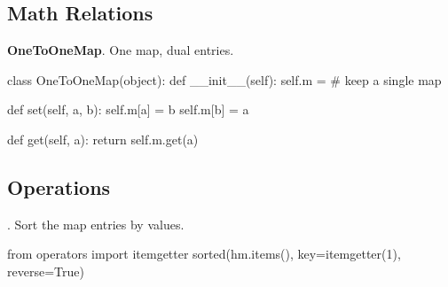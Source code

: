 \subsection{Math Relations}
\textbf{OneToOneMap}. One map, dual entries.
\begin{python}
class OneToOneMap(object):
    def __init__(self):
        self.m = {}  # keep a single map

    def set(self, a, b):
        self.m[a] = b
        self.m[b] = a

    def get(self, a):
        return self.m.get(a)
\end{python}
\subsection{Operations}
. Sort the map entries by values. 
\begin{python}
from operators import itemgetter 
sorted(hm.items(), key=itemgetter(1), reverse=True)
\end{python}
